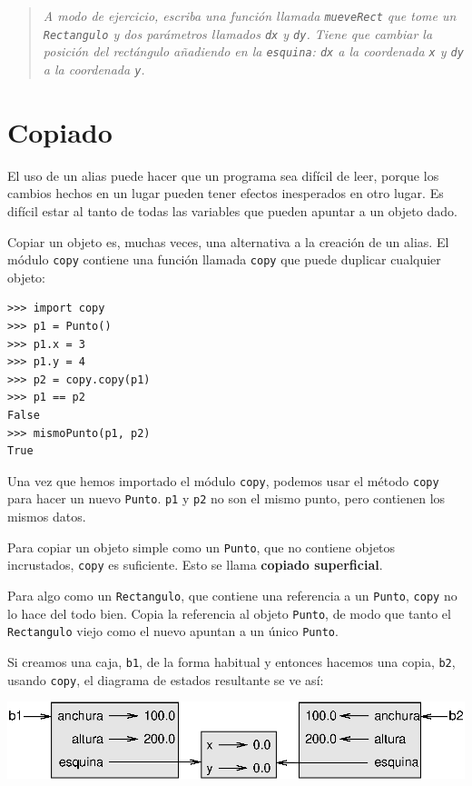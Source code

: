 \begin{quote}
{\em A modo de ejercicio, escriba una función llamada \texttt{mueveRect} que tome
un \texttt{Rectangulo} y dos parámetros llamados \texttt{dx} y \texttt{dy}. Tiene que cambiar
la posición del rectángulo añadiendo en la  \texttt{esquina}: \texttt{dx} a la coordenada \texttt{x}  y  \texttt{dy} a la coordenada \texttt{y}.}
\end{quote}


\section{Copiado}

El uso de un alias puede hacer que un programa sea difícil de leer,
porque los cambios hechos en un lugar pueden tener efectos inesperados
en otro lugar. Es difícil estar al tanto de todas las variables que 
pueden apuntar a un objeto dado.

Copiar un objeto es, muchas veces, una alternativa a la creación de un alias.
El módulo \texttt{copy} contiene una función llamada \texttt{copy} que puede
duplicar cualquier objeto:

\beforeverb
\begin{verbatim}
>>> import copy
>>> p1 = Punto()
>>> p1.x = 3
>>> p1.y = 4
>>> p2 = copy.copy(p1)
>>> p1 == p2
False
>>> mismoPunto(p1, p2)
True
\end{verbatim}
\afterverb
%
Una vez que hemos importado el módulo \texttt{copy}, podemos usar el método \texttt{copy}
para hacer un nuevo \texttt{Punto}.  \texttt{p1} y \texttt{p2} no son el mismo punto, pero
contienen los mismos datos.

Para copiar un objeto simple como un \texttt{Punto}, que no contiene objetos incrustados,
\texttt{copy} es suficiente. Esto se llama {\bf copiado superficial}.

Para algo como un \texttt{Rectangulo}, que contiene una referencia a un 
\texttt{Punto}, \texttt{copy} no lo hace del todo bien. Copia la referencia al objeto
\texttt{Punto}, de modo que tanto el \texttt{Rectangulo} viejo como el nuevo apuntan a
un único \texttt{Punto}.

Si creamos una caja, \texttt{b1}, de la forma habitual y entonces hacemos una
copia, \texttt{b2}, usando \texttt{copy}, el diagrama de estados resultante se ve
así:

\beforefig
\centerline{\includegraphics{illustrations/rectangle2.eps}}
\afterfig


